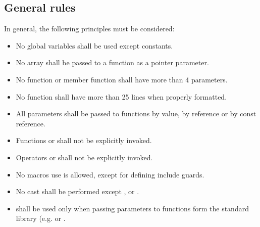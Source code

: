 \subsection{General rules}

In general, the following principles must be considered:

\begin{itemize}

\item No global variables shall be used except constants.

\item No array shall be passed to a function as a pointer parameter.

\item No function or member function shall have more than 4 parameters.

\item No function shall have more than 25 lines when properly formatted.

\item All parameters shall be passed to functions by value, by reference
or by const reference.

\item Functions  or  shall not be explicitly invoked.

\item Operators  or  shall not be explicitly invoked.

\item No macros use is allowed, except for defining include guards.

\item No cast shall be performed except
,  or .

\item {} shall be used only when passing parameters
to functions form the standard library (e.g.  or .

\end{itemize}
